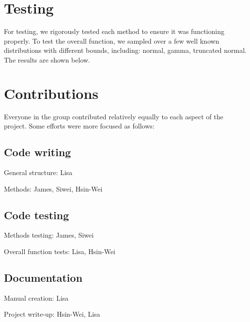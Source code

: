 \documentclass[11pt, oneside]{article}   	%
\begin{document}
\section{Testing}

For testing, we rigorously tested each method to ensure it was functioning properly.  To test the overall function, we sampled over a few well known distributions with different bounds, including:  normal, gamma, truncated normal.  The results are shown below.



\section{Contributions}

Everyone in the group contributed relatively equally to each aspect of the project.  Some efforts were more focused as follows:

\subsection*{Code writing}

General structure: Lisa

Methods: James, Siwei, Hsin-Wei

\subsection*{Code testing}

Methods testing: James, Siwei

Overall function tests: Lisa, Hsin-Wei

\subsection*{Documentation} 

Manual creation: Lisa

Project write-up:  Hsin-Wei, Lisa
\end{document}
